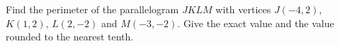 Find the perimeter of the parallelogram $JKLM$ with vertices $J(-4,2)$, $K(1,2)$, $L(2,-2)$ and $M(-3,-2)$. Give the exact value and the value rounded to the nearest tenth.
